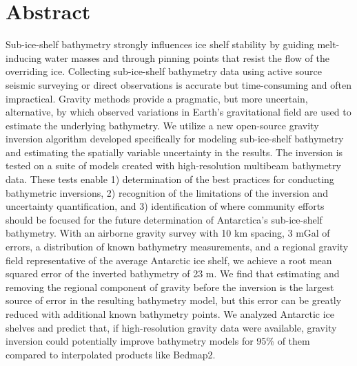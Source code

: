 \documentclass[tc, manuscript]{copernicus}
\begin{document}
\section*{Abstract}
Sub-ice-shelf bathymetry strongly influences ice shelf stability by guiding melt-inducing water masses and through pinning points that resist the flow of the overriding ice. Collecting sub-ice-shelf bathymetry data using active source seismic surveying or direct observations is accurate but time-consuming and often impractical. Gravity methods provide a pragmatic, but more uncertain, alternative, by which observed variations in Earth's gravitational field are used to estimate the underlying bathymetry. We utilize a new open-source gravity inversion algorithm developed specifically for modeling sub-ice-shelf bathymetry and estimating the spatially variable uncertainty in the results. The inversion is tested on a suite of models created with high-resolution multibeam bathymetry data. These tests enable 1) determination of the best practices for conducting bathymetric inversions, 2) recognition of the limitations of the inversion and uncertainty quantification, and 3) identification of where community efforts should be focused for the future determination of Antarctica's sub-ice-shelf bathymetry. With an airborne gravity survey with 10 km spacing, 3 mGal of errors, a distribution of known bathymetry measurements, and a regional gravity field representative of the average Antarctic ice shelf, we achieve a root mean squared error of the inverted bathymetry of 23 m. We find that estimating and removing the regional component of gravity before the inversion is the largest source of error in the resulting bathymetry model, but this error can be greatly reduced with additional known bathymetry points. We analyzed Antarctic ice shelves and predict that, if high-resolution gravity data were available, gravity inversion could potentially improve bathymetry models for 95\% of them compared to interpolated products like Bedmap2.
\end{document}
